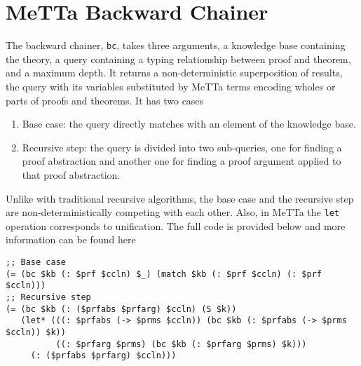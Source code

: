 \documentclass{easychair}
\begin{document}

\appendix
\section{MeTTa Backward Chainer}
\label{sect:metta-backward-chainer}

The backward chainer, \texttt{bc}, takes three arguments, a knowledge
base containing the theory, a query containing a typing relationship
between proof and theorem, and a maximum depth.  It returns a
non-deterministic superposition of results, the query with its
variables substituted by MeTTa terms encoding wholes or parts of
proofs and theorems.  It has two cases
\begin{enumerate}
\item Base case: the query directly matches with an element of the
  knowledge base.
\item Recursive step: the query is divided into two sub-queries, one
  for finding a proof abstraction and another one for finding a proof
  argument applied to that proof abstraction.
\end{enumerate}
Unlike with traditional recursive algorithms, the base case and the
recursive step are non-deterministically competing with each other.
Also, in MeTTa the \texttt{let} operation corresponds to unification.
The full code is provided below and more information can be found
here~\cite{TODO} \small{
\begin{verbatim}
;; Base case
(= (bc $kb (: $prf $ccln) $_) (match $kb (: $prf $ccln) (: $prf $ccln)))
;; Recursive step
(= (bc $kb (: ($prfabs $prfarg) $ccln) (S $k))
   (let* (((: $prfabs (-> $prms $ccln)) (bc $kb (: $prfabs (-> $prms $ccln)) $k))
          ((: $prfarg $prms) (bc $kb (: $prfarg $prms) $k)))
     (: ($prfabs $prfarg) $ccln)))
\end{verbatim}
}

\label{sect:bib}
%
%
%


\end{document}
